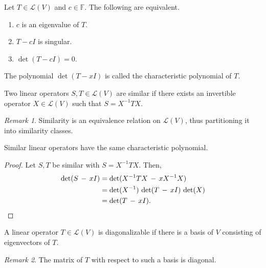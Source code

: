 \documentclass[11pt]{article}
\newcommand{\F}{\mathbb{F}}
\newcommand{\I}{I}
\newcommand{\alg}[1]{\mathscr{#1}}
\newcommand{\algL}{\alg{L}}
\theoremstyle{definition}
\theoremstyle{remark}
\newtheorem*{remark}{Remark}
\numberwithin{equation}{section}
\begin{document}
    \begin{theorem}
        Let $T \in \algL(V)$ and $c \in \F$. The following are equivalent.
        \begin{enumerate}
            \itemsep0em 
            \item $c$ is an eigenvalue of $T$.
            \item $T - c \I$ is singular.
            \item $\det(T - c \I) = 0$.
        \end{enumerate}
    \end{theorem}

    \begin{definition}
        The polynomial $\det(T - x\I)$ is called the characteristic polynomial
        of $T$.
    \end{definition}
    
    \begin{definition}
        Two linear operators $S, T \in \algL(V)$ are similar if there exists an
        invertible operator $X \in \algL(V)$ such that $S = X^{-1} T X$.

        \begin{remark}
            Similarity is an equivalence relation on $\algL(V)$, thus partitioning it
            into similarity classes.
        \end{remark}
    \end{definition}

    \begin{lemma}
        Similar linear operators have the same characteristic polynomial.
    \end{lemma}
    \begin{proof}
        Let $S, T$ be similar with $S = X^{-1}TX$. Then,
        \begin{align*}
            \det(S \,-\, x\I) &= \det(X^{-1}TX \,-\, xX^{-1}X) \\
                &= \det(X^{-1})\,\det(T \,-\, x\I)\,\det(X) \\
                &= \det(T \,-\, x\I). \qedhere
        \end{align*}
    \end{proof}
    
    \begin{definition}
        A linear operator $T \in \algL(V)$ is diagonalizable if there is a basis of
        $V$ consisting of eigenvectors of $T$.
        \begin{remark}
            The matrix of $T$ with respect to such a basis is diagonal.
        \end{remark}
    \end{definition}
\end{document}
